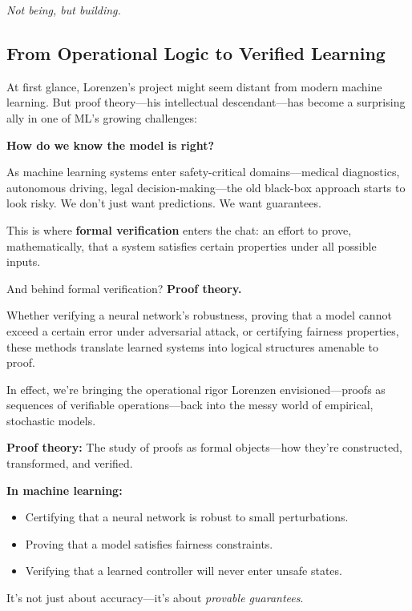 \begin{center}
    \textit{Not being, but building.}
\end{center}

\vspace{1em}

\subsection{From Operational Logic to Verified Learning}

At first glance, Lorenzen’s project might seem distant from modern machine learning. But proof theory—his intellectual descendant—has become a surprising ally in one of ML’s growing challenges:

\textbf{How do we know the model is right?}

As machine learning systems enter safety-critical domains—medical diagnostics, autonomous driving, legal decision-making—the old black-box approach starts to look risky. We don’t just want predictions. We want guarantees.

This is where \textbf{formal verification} enters the chat: an effort to prove, mathematically, that a system satisfies certain properties under all possible inputs.

And behind formal verification? \textbf{Proof theory.}

Whether verifying a neural network’s robustness, proving that a model cannot exceed a certain error under adversarial attack, or certifying fairness properties, these methods translate learned systems into logical structures amenable to proof.

In effect, we’re bringing the operational rigor Lorenzen envisioned—proofs as sequences of verifiable operations—back into the messy world of empirical, stochastic models.

\vspace{1em}

\begin{tcolorbox}[colback=gray!5!white, colframe=black, title=\textbf{Sidebar: Why Proof Theory Matters for ML}, fonttitle=\bfseries, arc=1.5mm, boxrule=0.4pt]
\textbf{Proof theory:} The study of proofs as formal objects—how they’re constructed, transformed, and verified.

\textbf{In machine learning:}  
\begin{itemize}
  \item Certifying that a neural network is robust to small perturbations.
  \item Proving that a model satisfies fairness constraints.
  \item Verifying that a learned controller will never enter unsafe states.
\end{itemize}

It’s not just about accuracy—it’s about \emph{provable guarantees}.
\end{tcolorbox}

